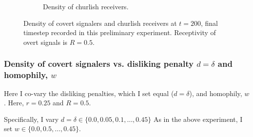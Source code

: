 \documentclass[11pt,letterpaper]{article}
\begin{document}
\begin{figure}[H]
\begin{subfigure}{0.49\textwidth}
    \caption{Density of churlish receivers.}
  \end{subfigure}
  
  \caption{Density of covert signalers and churlish receivers at $t=200$, 
    final timestep recorded in this preliminary experiment. Receptivity of
    overt signals is $R=0.5$.}
  \label{fig:dislikingHomophilyHeatmap}
\end{figure}


\subsubsection{Density of covert signalers vs. disliking penalty $d=\delta$ and homophily, $w$}

Here I co-vary the disliking penalties, which I set equal ($d=\delta$), and
homophily, $w$. Here, $r=0.25$ and $R=0.5$. 

Specifically, I vary $d=\delta \in \{0.0, 0.05, 0.1, \ldots, 0.45\}$
As in the above experiment, I set $w \in \{0.0, 0.5, \ldots, 0.45\}$.
\end{document}
